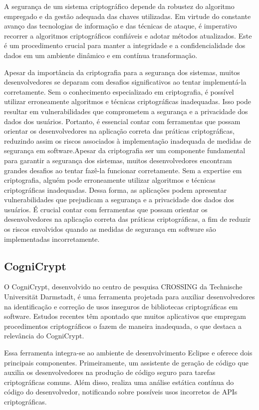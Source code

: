 A segurança de um sistema criptográfico depende da robustez do algoritmo empregado e da gestão adequada das chaves utilizadas. Em virtude do constante avanço das tecnologias de informação e das técnicas de ataque, é imperativo recorrer a algoritmos criptográficos confiáveis e adotar métodos atualizados. Este é um procedimento crucial para manter a integridade e a confidencialidade dos dados em um ambiente dinâmico e em contínua transformação.

Apesar da importância da criptografia para a segurança dos sistemas, muitos desenvolvedores se deparam com desafios significativos ao tentar implementá-la corretamente. Sem o conhecimento especializado em criptografia, é possível utilizar erroneamente algoritmos e técnicas criptográficas inadequadas. Isso pode resultar em vulnerabilidades que comprometem a segurança e a privacidade dos dados dos usuários. Portanto, é essencial contar com ferramentas que possam orientar os desenvolvedores na aplicação correta das práticas criptográficas, reduzindo assim os riscos associados à implementação inadequada de medidas de segurança em software.Apesar da criptografia ser um componente fundamental para garantir a segurança dos sistemas, muitos desenvolvedores encontram grandes desafios ao tentar fazê-la funcionar corretamente. Sem a expertise em criptografia, alguém pode erroneamente utilizar algoritmos e técnicas criptográficas inadequadas. Dessa forma, as aplicações podem apresentar vulnerabilidades que prejudicam a segurança e a privacidade dos dados dos usuários. É crucial contar com ferramentas que possam orientar os desenvolvedores na aplicação correta das práticas criptográficas, a fim de reduzir os riscos envolvidos quando as medidas de segurança em software são implementadas incorretamente.

\subsection{CogniCrypt} %

O CogniCrypt, desenvolvido no centro de pesquisa CROSSING da Technische Universität Darmstadt, é uma ferramenta projetada para auxiliar desenvolvedores na identificação e correção de usos inseguros de bibliotecas criptográficas em software. Estudos recentes têm apontado que muitos aplicativos que empregam procedimentos criptográficos o fazem de maneira inadequada, o que destaca a relevância do CogniCrypt.

Essa ferramenta integra-se ao ambiente de desenvolvimento Eclipse e oferece dois principais componentes. Primeiramente, um assistente de geração de código que auxilia os desenvolvedores na produção de código seguro para tarefas criptográficas comuns. Além disso, realiza uma análise estática contínua do código do desenvolvedor, notificando sobre possíveis usos incorretos de APIs criptográficas.

